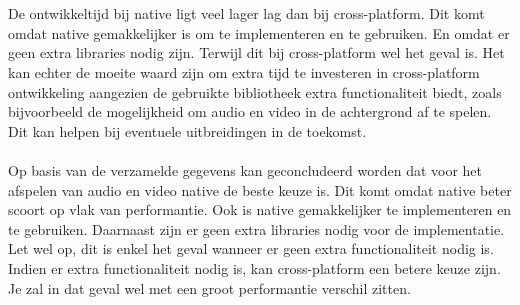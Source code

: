 \\\\
De ontwikkeltijd bij
native ligt veel lager lag dan bij cross-platform. Dit komt omdat native gemakkelijker is om te implementeren en te gebruiken.
En omdat er geen extra libraries nodig zijn. Terwijl dit bij cross-platform wel het geval is.
Het kan echter de moeite waard zijn om extra tijd te investeren in cross-platform ontwikkeling 
aangezien de gebruikte bibliotheek extra functionaliteit biedt, zoals bijvoorbeeld de 
mogelijkheid om audio en video in de achtergrond af te spelen. Dit kan helpen bij eventuele 
uitbreidingen in de toekomst.
\\\\
Op basis van de verzamelde gegevens kan geconcludeerd worden dat voor het afspelen van audio en video native de beste keuze is.
Dit komt omdat native beter scoort op vlak van performantie. Ook is native gemakkelijker te implementeren
en te gebruiken. Daarnaast zijn er geen extra libraries nodig voor de implementatie. Let wel op, dit is enkel het geval
wanneer er geen extra functionaliteit nodig is. Indien er extra functionaliteit nodig is, kan
cross-platform een betere keuze zijn. Je zal in dat geval wel met een groot performantie verschil zitten.
















